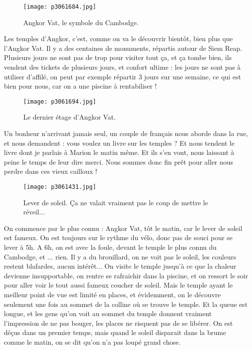 \documentclass{book}
\begin{document}
\begin{figure}[h]
\centering
\texttt{[image: p3061684.jpg]}
\caption*{Angkor Vat, le symbole du Cambodge.}
\end{figure}

Les temples d'Angkor, c'est, comme on va le découvrir bientôt, bien plus que l'Angkor Vat. Il y a des centaines de monuments, répartis autour de Siem Reap. Plusieurs jours ne sont pas de trop pour visiter tout ça, et ça tombe bien, ils vendent des tickets de plusieurs jours, et confort ultime : les jours ne sont pas à utiliser d'affilé, on peut par exemple répartir 3 jours sur une semaine, ce qui est bien pour nous, car on a une piscine à rentabiliser !


\begin{figure}[h]
\centering
\texttt{[image: p3061694.jpg]}
\caption*{Le dernier étage d'Angkor Vat.}
\end{figure}

Un bonheur n'arrivant jamais seul, un couple de français nous aborde dans la rue, et nous demandent : vous voulez un livre sur les temples ? Et nous tendent le livre dont je parlais à Marion le matin même. Et ils s'en vont, nous laissant à peine le temps de leur dire merci. Nous sommes donc fin prêt pour aller nous perdre dans ces vieux cailloux !


\begin{figure}[h]
\centering
\texttt{[image: p3061431.jpg]}
\caption*{Lever de soleil. Ça ne valait vraiment pas le coup de mettre le réveil...}
\end{figure}

On commence par le plus connu : Angkor Vat, tôt le matin, car le lever de soleil est fameux. On est toujours sur le rythme du vélo, donc pas de souci pour se lever à 5h. A 6h, on est avec la foule, devant le temple le plus connu du Cambodge, et ... rien. Il y a du brouillard, on ne voit pas le soleil, les couleurs restent blafardes, aucun intérêt... On visite le temple jusqu'à ce que la chaleur devienne insupportable, on rentre se rafraichir dans la piscine, et on ressort le soir pour aller voir le tout aussi fameux coucher de soleil. Mais le temple ayant le meilleur point de vue est limité en places, et évidemment, on le découvre seulement une fois au sommet de la colline où se trouve le temple. Et la queue est longue, et les gens qu'on voit au sommet du temple donnent vraiment l'impression de ne pas bouger, les places ne risquent pas de se libérer. On est déçus dans un premier temps, mais quand le soleil disparait dans la brume comme le matin, on se dit qu'on n'a pas loupé grand chose.
\end{document}
